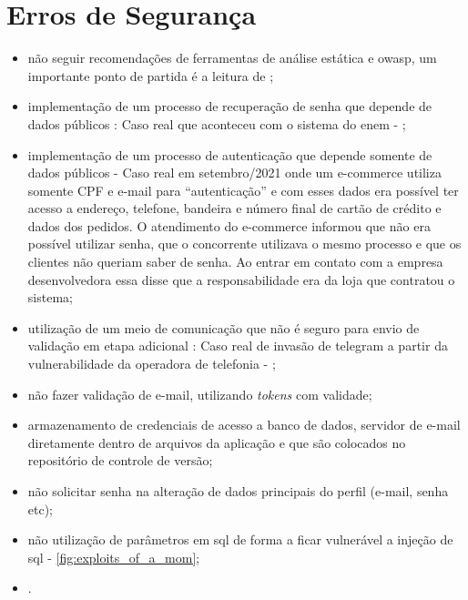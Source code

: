 \section{Erros de Segurança}

\begin{itemize}
    \item não seguir recomendações de ferramentas de análise estática e \ac{owasp}, um importante ponto de partida é a leitura de ;

    \item implementação de um processo de recuperação de senha que depende de dados públicos : 
    Caso real que aconteceu com o sistema do \ac{enem} -   \cite{medicina_cachaca};

    \item implementação de um processo de autenticação que depende somente de dados públicos - Caso real em setembro/2021 onde um e-commerce utiliza somente CPF e e-mail para \enquote{autenticação} e com esses dados era possível ter acesso a endereço, telefone, bandeira e número final de cartão de crédito e dados dos pedidos. O atendimento do e-commerce informou que não era possível utilizar senha, que o concorrente utilizava o mesmo processo e que os clientes não queriam saber de senha. Ao entrar em contato com a empresa desenvolvedora essa disse que a responsabilidade era da loja que contratou o sistema;
    
    \item utilização de um meio de comunicação que não é seguro para envio de validação em etapa adicional : Caso real de invasão de \gls{telegram} a partir da vulnerabilidade da operadora de telefonia -  \citeauthor{invasao_telegram};
    
    \item não fazer validação de e-mail, utilizando \textit{tokens} com validade;
    
    \item armazenamento de credenciais de acesso a banco de dados, servidor de e-mail diretamente dentro de arquivos da aplicação e que são colocados no repositório de controle de versão;
    
    \item não solicitar senha na alteração de dados principais do perfil (e-mail, senha etc);
    
    \item não utilização de parâmetros em \ac{sql} de forma a ficar vulnerável a injeção de \ac{sql} - \autoref{fig:exploits_of_a_mom};

    \item \erroArmazenarSenhaAberta .
\end{itemize}

